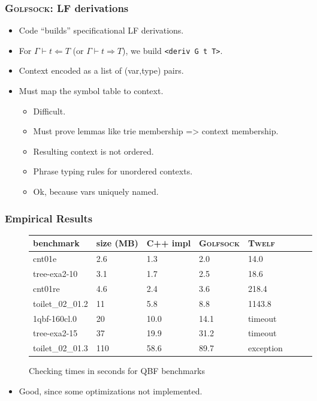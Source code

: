 \documentclass[11pt]{beamer}
\begin{document}
\begin{frame}
\frametitle{\textsc{Golfsock}: LF derivations}
\begin{itemize}
\item Code ``builds'' specificational LF derivations.
\item For $\Gamma \vdash t \Leftarrow T$ (or $\Gamma \vdash t \Rightarrow T$), we build \texttt{<deriv G t T>}.
\item Context encoded as a list of (var,type) pairs.
\item Must map the symbol table to context.
\begin{itemize}
\item Difficult.
\item Must prove lemmas like trie membership => context membership.
\item Resulting context is not ordered.
\item Phrase typing rules for unordered contexts.
\item Ok, because vars uniquely named.
\end{itemize}
\end{itemize}
\end{frame}

\begin{frame}
\frametitle{Empirical Results}
\begin{figure}
\footnotesize
\begin{center}
\begin{tabular}{|l|l|l|l|l|l|l|l|}
\hline
benchmark & size (MB) & C++ impl & \textsc{Golfsock} & \textsc{Twelf}
\\
\hline
cnt01e
&
2.6
&
1.3
&
2.0
&
14.0 
\\
tree-exa2-10
&
3.1
&
1.7
&
2.5
&
18.6
\\
cnt01re
&
4.6
&
2.4
&
3.6
&
218.4
\\
toilet\_02\_01.2
&
11
&
5.8
&
8.8
&
1143.8
\\
1qbf-160cl.0
&
20
&
10.0
&
14.1
&
timeout
\\
tree-exa2-15
&
37
&
19.9
&
31.2
&
timeout 
\\
toilet\_02\_01.3
&
110
&
58.6
&
89.7
&
exception 
\\
\hline
\end{tabular}
\end{center}
\caption{\label{fig:qbf}Checking times in seconds for QBF benchmarks}
\end{figure}

\begin{itemize}
\item Good, since some optimizations not implemented.
\end{itemize}

\end{frame}
\end{document}
